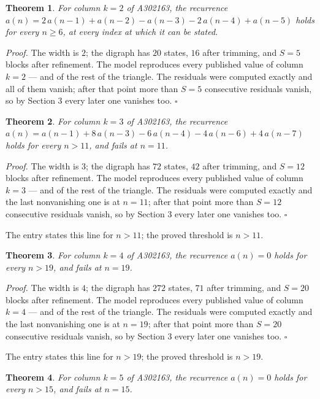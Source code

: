 \documentclass[11pt]{article}
\newtheorem{theorem}{Theorem}
\theoremstyle{definition}
\begin{document}
\begin{theorem} For column $k = 2$ of A302163, the recurrence $a(n) = 2\,a(n-1) + a(n-2) - a(n-3) - 2\,a(n-4) + a(n-5)$ holds for every $n \ge 6$, at every index at which it can be stated.\end{theorem}

{\itshape Proof.} The width is $2$; the digraph has $20$ states, $16$ after trimming, and $S = 5$ blocks after refinement. The model reproduces every published value of column $k = 2$ --- and of the rest of the triangle. The residuals were computed exactly and all of them vanish; after that point more than $S = 5$ consecutive residuals vanish, so by Section 3 every later one vanishes too. $\square$

\begin{theorem} For column $k = 3$ of A302163, the recurrence $a(n) = a(n-1) + 8\,a(n-3) - 6\,a(n-4) - 4\,a(n-6) + 4\,a(n-7)$ holds for every $n > 11$, and fails at $n = 11$.\end{theorem}

{\itshape Proof.} The width is $3$; the digraph has $72$ states, $42$ after trimming, and $S = 12$ blocks after refinement. The model reproduces every published value of column $k = 3$ --- and of the rest of the triangle. The residuals were computed exactly and the last nonvanishing one is at $n = 11$; after that point more than $S = 12$ consecutive residuals vanish, so by Section 3 every later one vanishes too. $\square$

The entry states this line for $n > 11$; the proved threshold is $n > 11$.

\begin{theorem} For column $k = 4$ of A302163, the recurrence $a(n) = 0$ holds for every $n > 19$, and fails at $n = 19$.\end{theorem}

{\itshape Proof.} The width is $4$; the digraph has $272$ states, $71$ after trimming, and $S = 20$ blocks after refinement. The model reproduces every published value of column $k = 4$ --- and of the rest of the triangle. The residuals were computed exactly and the last nonvanishing one is at $n = 19$; after that point more than $S = 20$ consecutive residuals vanish, so by Section 3 every later one vanishes too. $\square$

The entry states this line for $n > 19$; the proved threshold is $n > 19$.

\begin{theorem} For column $k = 5$ of A302163, the recurrence $a(n) = 0$ holds for every $n > 15$, and fails at $n = 15$.\end{theorem}
\end{document}
